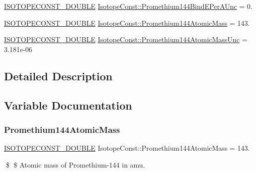 \begin{DoxyCompactItemize}
\item 
\mbox{\hyperlink{group___isotope_const-_macros_ga8f45a7272ce02c0b4c65c44636ed719a}{I\+S\+O\+T\+O\+P\+E\+C\+O\+N\+S\+T\+\_\+\+D\+O\+U\+B\+LE}} \mbox{\hyperlink{group___isotope_const-_promethium-_pm144_gae0e690d9717636209359a337138b0464}{Isotope\+Const\+::\+Promethium144\+Bind\+E\+Per\+A\+Unc}} = 0.
\item 
\mbox{\hyperlink{group___isotope_const-_macros_ga8f45a7272ce02c0b4c65c44636ed719a}{I\+S\+O\+T\+O\+P\+E\+C\+O\+N\+S\+T\+\_\+\+D\+O\+U\+B\+LE}} \mbox{\hyperlink{group___isotope_const-_promethium-_pm144_gaec8dc0f8641ee9553865df2967d29cad}{Isotope\+Const\+::\+Promethium144\+Atomic\+Mass}} = 143.
\item 
\mbox{\hyperlink{group___isotope_const-_macros_ga8f45a7272ce02c0b4c65c44636ed719a}{I\+S\+O\+T\+O\+P\+E\+C\+O\+N\+S\+T\+\_\+\+D\+O\+U\+B\+LE}} \mbox{\hyperlink{group___isotope_const-_promethium-_pm144_ga2600a671f80d721080e0ab40eac0360a}{Isotope\+Const\+::\+Promethium144\+Atomic\+Mass\+Unc}} = 3.\+181e-\/06
\end{DoxyCompactItemize}


\subsection{Detailed Description}


\subsection{Variable Documentation}
\mbox{\label{group___isotope_const-_promethium-_pm144_gaec8dc0f8641ee9553865df2967d29cad}} 
\subsubsection{\texorpdfstring{Promethium144\+Atomic\+Mass}{Promethium144AtomicMass}}
{\footnotesize\ttfamily \mbox{\hyperlink{group___isotope_const-_macros_ga8f45a7272ce02c0b4c65c44636ed719a}{I\+S\+O\+T\+O\+P\+E\+C\+O\+N\+S\+T\+\_\+\+D\+O\+U\+B\+LE}} Isotope\+Const\+::\+Promethium144\+Atomic\+Mass = 143.}

\$ \$ Atomic mass of Promethium-\/144 in amu. \mbox{\label{group___isotope_const-_promethium-_pm144_ga2600a671f80d721080e0ab40eac0360a}} 
